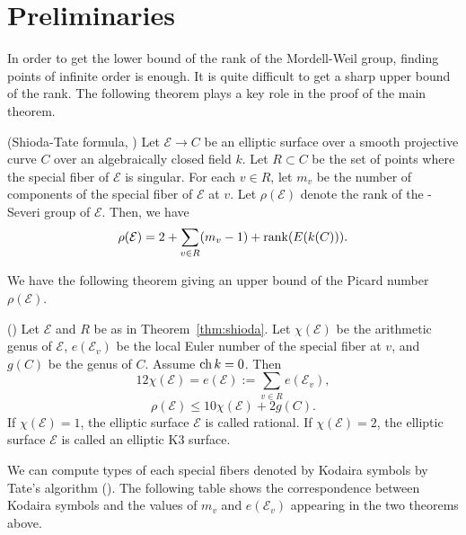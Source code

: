 \documentclass[main]{subfiles}
\begin{document}
\section{Preliminaries}

In order to get the lower bound of the rank of the Mordell-Weil group, finding points of infinite order is enough.
It is quite difficult to get a sharp upper bound of the rank.
The following theorem plays a key role in the proof of the main theorem.
\begin{thm}{(Shioda-Tate formula, \cite[Corollary 5.3]{ref:shioda1990})}
    \label{thm:shioda}
    Let $\mathcal{E} \to C$ be an elliptic surface over a smooth projective curve $C$ over an algebraically closed field $k$.
    Let $R \subset C$ be the set of points where the special fiber of $\mathcal{E}$ is singular.
    For each $v \in R$, let $m_{v}$ be the number of components of the special fiber of $\mathcal{E}$ at $v$.
    Let $\rho(\mathcal{E})$ denote the rank of the \Neron-Severi group of $\mathcal{E}$.
    Then, we have
    \begin{equation*}
        \rho (\mathcal{E}) = 2 + \sum_{v \in R} (m_{v} - 1) + \operatorname{rank}(E(k(C))).
    \end{equation*}
\end{thm}

We have the following theorem giving an upper bound of the Picard number $\rho(\mathcal{E})$.

\begin{thm}{(\cite[Twierdzenie 2.2.9, 2.2.10, 2.2.19]{ref:naskreckiphd})}
    Let $\mathcal{E}$ and $R$ be as in Theorem~\ref{thm:shioda}.
    Let $\chi(\mathcal{E})$ be the arithmetic genus of $\mathcal{E}$, $e(\mathcal{E}_v)$ be the local Euler number of the special fiber at $v$, and $g(C)$ be the genus of $C$. \label{thm:rho}
    Assume $\operatorname{ch} k = 0$.
    Then
    \begin{equation*}
        12 \chi(\mathcal{E}) = e(\mathcal{E}) := \sum_{v \in R} e(\mathcal{E}_{v}),
    \end{equation*}
    \begin{equation*}
        \rho(\mathcal{E}) \leq 10 \chi(\mathcal{E}) + 2g(C).
    \end{equation*}
    If $\chi(\mathcal{E}) = 1$, the elliptic surface $\mathcal{E}$ is called rational.
    If $\chi(\mathcal{E}) = 2$, the elliptic surface $\mathcal{E}$ is called an elliptic K3 surface.
\end{thm}

We can compute types of each special fibers denoted by Kodaira symbols by Tate's algorithm (\cite[IV \S 9]{ref:advancedaec}).
The following table shows the correspondence between Kodaira symbols and the values of $m_v$ and $e(\mathcal{E}_v)$ appearing in the two theorems above.
\end{document}
